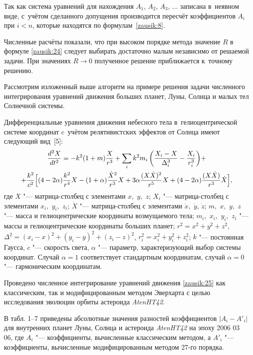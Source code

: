 Так как система уравнений для нахождения $A_1$, $A_2$, $A_3$, $\dots $ записана в~неявном виде,  с~учётом сделанного допущения производится пересчёт коэффициентов $A_i$ при $i<n$, которые находятся по формулам~\eqref{zausik:8}. 

Численные расчёты показали, что при высоком порядке метода значение $R$ в формуле  \eqref{zausik:24} следует выбирать достаточно малым  независимо от решаемой задачи. При значениях $R \to 0$ полученное решение приближается к~точному решению.

\smallskip

Рассмотрим изложенный выше алгоритм на примере решения задачи численного интегрирования уравнений движения больших планет, Луны, Солнца и малых тел Солнечной системы.

Дифференциальные уравнения движения небесного тела  в~гелиоцентрической системе координат c~учётом релятивистских эффектов от Солнца имеют следующий вид~[5]:
\begin{multline}
\frac{d^2X}{dt^2}=-k^2(1+m)\frac{X}{r^3}+\sum_i{k^2m_i\left(\frac{X_i-X}{\Delta^3_i}-\frac{X_i}{r^3_i}\right)}+\\
+\frac{k^2}{c^2}\Bigl[ (4-2\alpha)\frac{k^2}{r^4}X- (1+\alpha)\frac{\dot{X}^2}{r^3}X+3\alpha \frac{(X\dot{X})^2}{r^5}X+ (4-2\alpha)\frac{(X\dot{X})}{r^3}\dot{X}\Bigr],
\label{zausik:25}
\end{multline}
где $X$ "--- матрица-столбец с элементами $x,$ $y,$ $z$; 
$X_i$ "--- матрица-столбец с элементами $x_i,$ $y_i,$ $z_i$; 
$\dot{X}$ "--- матрица-столбец с элементами $\dot{x},$ $\dot{y}$, $\dot{z}$; $m,$ $x,$ $y,$ $z$ "--- масса и гелиоцентрические координаты возмущаемого тела; $m_i,$ $x_i,$ $y_i,$ $z_i$ "--- массы и гелиоцентрические координаты больших планет; 
$r^2=x^2+y^2+z^2$, $\Delta^2=(x_i-x)^2+(y_i-y)^2+(z_i-z)^2$, $r^2_i=x^2_i+y^2_i+z^2_i$;  $k$ "--- постоянная Гаусса, $c$ "--- скорость света, $\alpha$ "--- параметр, характеризующий выбор системы координат. Случай $\alpha=1$ соответствует стандартным координатам, случай  $\alpha=0$ "--- гармоническим координатам.

Проведено численное интегрирование уравнений движения \eqref{zausik:25} как классическим, так и модифицированным методом  Эверхарта с целью исследования эволюции орбиты астероида {\sl Aten\;HT42}. 

В табл. 1--7 приведены абсолютные значения разностей коэффициентов $|A_i-A'_i|$ для внутренних планет Луны, Солнца и астероида {\sl Aten\;HT42} на эпоху 2006 03 06, где $A_i$ "--- коэффициенты, вычисленные классическим методом, а $A'_i$ "--- коэффициенты, вычисленные модифицированным методом 27-го порядка.


